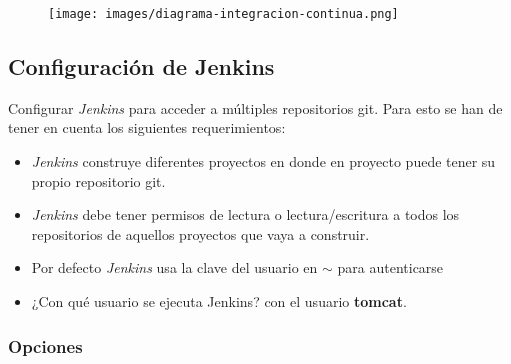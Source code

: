 \begin{figure}[htbp]
\centering
\texttt{[image: images/diagrama-integracion-continua.png]}
\caption{}
\end{figure}

\subsection{Configuración de Jenkins}

Configurar \emph{Jenkins} para acceder a múltiples repositorios git.
Para esto se han de tener en cuenta los siguientes requerimientos:

\begin{itemize}
\item
  \emph{Jenkins} construye diferentes proyectos en donde en proyecto
  puede tener su propio repositorio git.
\item
  \emph{Jenkins} debe tener permisos de lectura o lectura/escritura a
  todos los repositorios de aquellos proyectos que vaya a construir.
\item
  Por defecto \emph{Jenkins} usa la clave del usuario en
  \texttt{\ensuremath{\sim}} para autenticarse
\item
  ¿Con qué usuario se ejecuta Jenkins? con el usuario \textbf{tomcat}.
\end{itemize}
\subsubsection{Opciones}

